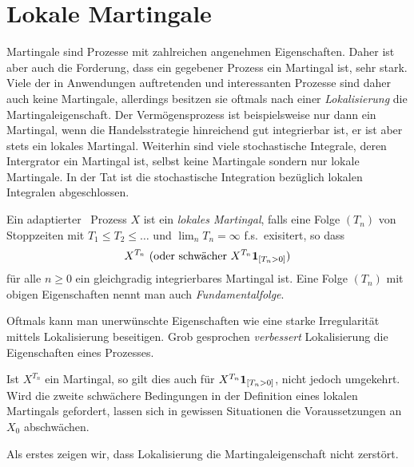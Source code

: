 \section{Lokale Martingale}

Martingale sind Prozesse mit zahlreichen angenehmen Eigenschaften. Daher ist
aber auch die Forderung, dass ein gegebener Prozess ein Martingal ist, sehr
stark. Viele der in Anwendungen auftretenden und interessanten Prozesse sind
daher auch keine Martingale, allerdings besitzen sie oftmals nach einer
\textit{Lokalisierung} die Martingaleigenschaft. Der Vermögensprozess ist
beispielsweise nur dann ein Martingal, wenn die Handelsstrategie hinreichend
gut integrierbar ist, er ist aber stets ein lokales Martingal. Weiterhin sind
viele stochastische Integrale, deren Intergrator ein Martingal ist, selbst keine
Martingale sondern nur lokale Martingale. In der Tat ist die stochastische
Integration bezüglich lokalen Integralen abgeschlossen.

\begin{defn}
\label{defn:1.17}
Ein adaptierter \cadlag\ Prozess $X$ ist ein \emph{lokales Martingal}, falls
eine Folge $(T_n)$ von Stoppzeiten mit $T_1 \le T_2 \le \ldots$ und
$\lim_nT_n=\infty$ f.s.\ exisitert, so dass
\begin{align*}
X^{T_n} \text{ (oder schwächer $X^{T_n}\mathbf{1}_{[T_n>0]}$)}
\end{align*}
für alle $n\ge 0$ ein gleichgradig integrierbares Martingal ist. Eine Folge
$(T_n)$ mit obigen Eigenschaften nennt man auch
\emph{Fundamentalfolge}.\fish
\end{defn}


Oftmals kann man unerwünschte Eigenschaften wie eine starke Irregularität
mittels Lokalisierung beseitigen. Grob gesprochen \textit{verbessert}
Lokalisierung die Eigenschaften eines Prozesses.

\begin{rem*}
Ist $X^{T_n}$ ein Martingal, so gilt dies auch für $X^{T_n}\mathbf{1}_{[T_n>0]}$,
nicht jedoch umgekehrt. Wird die zweite schwächere Bedingungen in der Definition
eines lokalen Martingals gefordert, lassen sich in gewissen Situationen die
Voraussetzungen an $X_0$ abschwächen.\map
\end{rem*}

Als erstes zeigen wir, dass Lokalisierung die Martingaleigenschaft nicht
zerstört.

